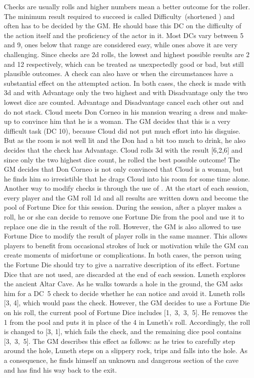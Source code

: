 Checks are usually  rolls and higher numbers mean a better outcome for the roller. 
The minimum result required to succeed is called Difficulty~(shortened ) and often has to be decided by the GM.
He should base this DC on the difficulty of the action itself and the proficiency of the actor in it.
Most DCs vary between 5 and 9, ones below that range are considered easy, while ones above it are very challenging.
%
\ofpar
%
Since checks are 2d rolls, the lowest and highest possible results are 2 and 12 respectively, which can be treated as unexpectedly good or bad, but still plausible outcomes.
A check can also have  or  when the circumstances have a substantial effect on the attempted action. 
In both cases, the check is made with 3d and with Advantage only the two highest and with Disadvantage only the two lowest dice are counted. 
Advantage and Disadvantage cancel each other out and do not stack.
%
\clearpage
%
{
	Cloud meets Don Corneo in his mansion wearing a dress and make-up to convince him that he is a woman.
	The GM decides that this is a very difficult task (DC 10), because Cloud did not put much effort into his disguise. 
	But as the room is not well lit and the Don had a bit too much to drink, he also decides that the check has Advantage. 
	Cloud rolls 3d with the result [6,2,6] and since only the two highest dice count, he rolled the best possible outcome! 
	The GM decides that Don Corneo is not only convinced that Cloud is a woman, but he finds him so irresistible that he drags Cloud into his room for some time alone.
}
%
\ofpar
%
Another way to modify checks is through the use of .
At the start of each session, every player and the GM roll 1d and all results are written down and become the pool of Fortune Dice for this session.
During the session, after a player makes a roll, he or she can decide to remove one Fortune Die from the pool and use it to replace one die in the result of the roll.
However, the GM is also allowed to use Fortune Dice to modify the result of player rolls in the same manner.
This allows players to benefit from occasional strokes of luck or motivation while the GM can create moments of misfortune or complications.
In both cases, the person using the Fortune Die should try to give a narrative description of its effect.
Fortune Dice that are not used, are discarded at the end of each session.
%
\ofpar
%
{
	Luneth explores the ancient Altar Cave. 
	As he walks towards a hole in the ground, the GM asks him for a DC~5 check to decide whether he can notice and avoid it.
	Luneth rolls [3, 4], which would pass the check.
	However, the GM decides to use a Fortune Die on his roll, the current pool of Fortune Dice includes \mbox{[1, 3, 3, 5]}.
	He removes the 1 from the pool and puts it in place of the 4 in Luneth's roll.  
	Accordingly, the roll is changed to [3, 1], which fails the check, and the remaining dice pool contains \mbox{[3, 3, 5]}.
	The GM describes this effect as follows: as he tries to carefully step around the hole, Luneth steps on a slippery rock, trips and falls into the hole.
	As a consequence, he finds himself an unknown and dangerous section of the cave and has find his way back to the exit.
}
